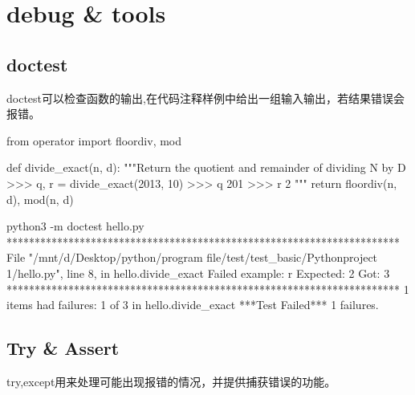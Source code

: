 \section{debug \& tools}

  \subsection{doctest}
    doctest可以检查函数的输出,在代码注释样例中给出一组输入输出，若结果错误会报错。
    \begin{codeblock}[language=python, caption={doctest hello.py}]
      from operator import floordiv, mod

      def divide_exact(n, d):
        """Return the quotient and remainder of  dividing N by D
        >>> q, r = divide_exact(2013, 10)
        >>> q
        201
        >>> r
        2
        """
        return floordiv(n, d), mod(n, d)
    \end{codeblock}

    \begin{codeblock}[language=bash, caption={doctest bash}]
      python3 -m doctest hello.py
      **********************************************************************
      File "/mnt/d/Desktop/python/program file/test/test_basic/Pythonproject
      1/hello.py", line 8, in hello.divide_exact
      Failed example:
          r
      Expected:
          2
      Got:
          3
      **********************************************************************
      1 items had failures:
        1 of   3 in hello.divide_exact
      ***Test Failed*** 1 failures.
    \end{codeblock}

  \subsection{Try \& Assert}
    try,except用来处理可能出现报错的情况，并提供捕获错误的功能。

